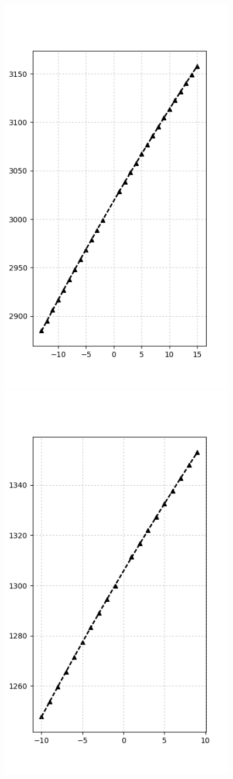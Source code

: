 \documentclass[14pt]{extarticle}
\begin{document}
\begin{figure}[!ht]
\begin{minipage}{0.5\textwidth}
		\centering
		\includegraphics[width=0.9\textwidth, height=1.1\textwidth]{../nu4_regr.png}
\end{minipage}%
\begin{minipage}{0.5\textwidth}
		\centering
		\includegraphics[width=0.9\textwidth, height=1.1\textwidth]{../nu3_regr.png}
\end{minipage}
\end{figure}
\end{document}
